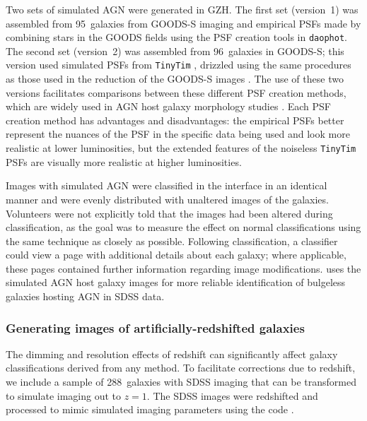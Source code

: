 \documentclass[a4paper,fleqn,usenatbib]{mnras}
\begin{document}
Two sets of simulated AGN were generated in GZH. The first set (version~1) was
assembled from 95~galaxies from GOODS-S imaging and empirical PSFs made by
combining stars in the GOODS fields using the PSF creation tools in
\texttt{daophot}.  The second set (version~2) was assembled from 96~galaxies in
GOODS-S; this version used simulated PSFs from \texttt{TinyTim} \citep{kri93},
drizzled using the same procedures as those used in the reduction of the GOODS-S
images \citep{koe02,koe03,gia04}. The use of these two versions facilitates
comparisons between these different PSF creation methods, which are widely used
in AGN host galaxy morphology studies
\citep[e.g.,][]{san04,sim08,pie10a,simm11}.  Each PSF creation method has
advantages and disadvantages: the empirical PSFs better represent the nuances
of the PSF in the specific data being used and look more realistic at lower
luminosities, but the extended features of the noiseless \texttt{TinyTim} PSFs
are visually more realistic at higher luminosities.

Images with simulated AGN were classified in the interface in an identical
manner and were evenly distributed with unaltered images of the galaxies.
Volunteers were not explicitly told that the images had been altered during
classification, as the goal was to measure the effect on normal classifications
using the same technique as closely as possible. Following classification, a
classifier could view a page with additional details about each galaxy; where
applicable, these pages contained further information regarding image
modifications. \citet{sim13} uses the simulated AGN host galaxy images for
more reliable identification of bulgeless galaxies hosting AGN in SDSS data.


\subsubsection{Generating images of artificially-redshifted galaxies}\label{ssec:ferengi}

The dimming and resolution effects of redshift can significantly affect galaxy
classifications derived from any method. To facilitate corrections due to
redshift, we include a sample of 288~galaxies with SDSS imaging that can be
transformed to simulate \hst{} imaging out to $z = 1$. 
The SDSS images were redshifted and processed to mimic simulated \hst{} imaging 
parameters using the \ferengi{} code \citep{bar08a}.

 
\end{document}
